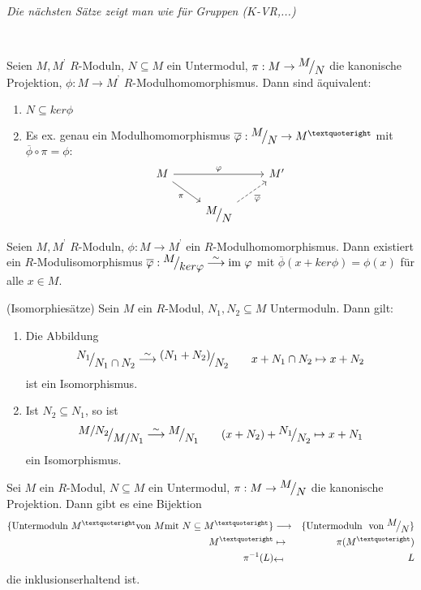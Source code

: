 \begin{center}
	\emph{Die nächsten Sätze zeigt man wie für Gruppen ($K$-VR,...)}
\end{center}
\ 
\begin{sa}
	Seien $M, M^{’} $ $R$-Moduln, $N \subseteq M $ ein Untermodul, $ \pi: M \to \QR{M}{N} $ die kanonische Projektion, $\phi: M \to M^{’} $ $R$-Modulhomomorphismus. Dann sind äquivalent: 
\begin{enumerate}[label= \roman*)]
	\item $N \subseteq ker\phi$
	\item Es ex. genau ein Modulhomomorphismus $\overline{\phi}: \QR{M}{N} \to M^{’} $ mit $\overline{\phi} \circ \pi = \phi:$
	$$\begin{tikzcd}
	M \arrow[swap]{dr}{\pi} \arrow{rr}{\phi} & & M'\\
	& \QR{M}{N} \arrow[swap,dashed]{ru}{\overline{\phi}}&
	\end{tikzcd}$$
	\end{enumerate}
\end{sa}
\begin{sa}[Homomorphiesatz] Seien $M, M^{’} $ $R$-Moduln,  $\phi: M \to M^{’} $ ein $R$-Modulhomomorphismus. Dann existiert ein $R$-Modulisomorphismus $\overline{\phi}: \QR{M}{ker\phi} \overset{\sim}{\longrightarrow} \im\phi $ mit $\overline{\phi}(x+ker\phi)=\phi(x) $ für alle $ x \in M$.
\end{sa}
\begin{sa}
	(Isomorphiesätze) Sein $M$ ein $R$-Modul, $N_1, N_2 \subseteq M$ Untermoduln. Dann gilt:
	\begin{enumerate}[label=\alph*)]
		\item Die Abbildung$$\QR{N_1}{N_1 \cap N_2} \overset{\sim}{\longrightarrow} \QR{(N_1+N_2)}{N_2} \qquad x + N_1\cap N_2  \mapsto x +N_2$$ ist ein Isomorphismus.
		\item Ist $ N_2 \subseteq N_1$, so ist
		 $$\QR{M/N_2}{M/N_1} \overset{\sim}{\longrightarrow} \QR{M}{N_1}\qquad (x+N_2)+\QR{N_1}{N_2} \mapsto x+N_1$$
		 ein Isomorphismus.
	\end{enumerate}
\end{sa}
\begin{sa}
	Sei $M$ ein $R$-Modul, $N \subseteq M$ ein Untermodul, $ \pi: M \to \QR{M}{N} $ die kanonische Projektion. Dann gibt es eine Bijektion 
	\begin{eqnarray*}
		\{\text{Untermoduln} \ M^{’} \text{von} \  M \text{mit} \ N \subseteq M^{’} \} &\longrightarrow &\{\text{Untermoduln } \text{ von } \QR{M}{N}\}\\
		M^{’}& \mapsto & \pi(M^{’}) \\
		\pi^{-1}(L) &\rotatebox[]{180}{$\mapsto$} & L %
	\end{eqnarray*}
	die inklusionserhaltend ist.
\end{sa}
